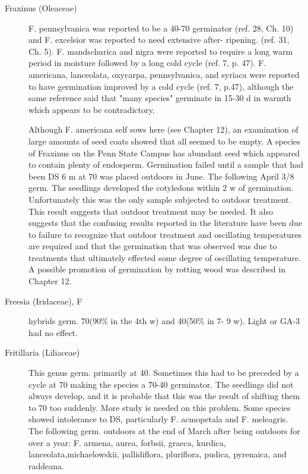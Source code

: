 \begin{description}
\item[Fraxinus (Oleaceae)] F. pennsylvanica was reported to be a 40-70
germinator (ref. 28, Ch. 10) and F. excelsior was reported to need extensive after-
ripening. (ref. 31, Ch. 5). F. mandschurica and nigra were reported to require a long
warm period in moisture followed by a long cold cycle (ref. 7, p. 47). F. americana,
lanceolata, oxycarpa, pennsylvanica, and syriaca were reported to have germination
improved by a cold cycle (ref. 7, p.47), although the same reference said that "many
species" germinate in 15-30 d in warmth which appears to be contradictory.

Although F. americana self sows here (see Chapter 12), an examination of
large amounts of seed coats showed that all seemed to be empty. A species of
Fraxinus on the Penn State Campus has abundant seed which appeared to contain
plenty of endosperm. Germination failed until a sample that had been DS 6 m at 70
was placed outdoors in June. The following April 3/8 germ. The seedlings developed
the cotyledons within 2 w of germination. Unfortunately this was the only sample
subjected to outdoor treatment. This result suggests that outdoor treatment may be
needed. It also suggests that the confusing results reported in the literature have been
due to failure to recognize that outdoor treatment and oscillating temperatures are
required and that the germination that was observed was due to treatments that
ultimately effected some degree of oscillating temperature. A possible promotion of
germination by rotting wood was described in Chapter 12.

\item[Freesia (Iridaceae), F] hybrids germ. 70(90\% in the 4th w) and 40(50\% in 7-
9 w). Light or GA-3 had no effect.

\item[Fritillaria (Liliaceae)] This genus germ. primarily at 40. Sometimes this had
to be preceded by a cycle at 70 making the species a 70-40 germinator. The
seedlings did not always develop, and it is probable that this was the result of shifting
them to 70 too suddenly. More study is needed on this problem. Some species
showed intolerance to DS, particularly F. acmopetala and F. meleagris. The following
germ. outdoors at the end of March after being outdoors for over a year: F. armena,
aurea, forbsii, graeca, kurdica, lanceolata,michaelowskii, pallidiflora, pluriflora,
pudica, pyrenaica, and raddeana.


\end{description}
